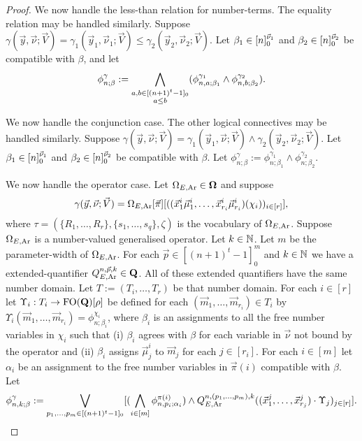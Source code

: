 \documentclass[../main/thesis.tex]{subfiles}
\begin{document}
\begin{proof}
  We now handle the less-than relation for number-terms. The equality relation
  may be handled similarly. Suppose $\gamma(\vec{y}, \vec{\nu}; \vec{V}) =
  \gamma_1(\vec{y}_1, \vec{\nu}_1; \vec{V}) \leq \gamma_2 (\vec{y}_2,
  \vec{\nu}_2 ; \vec{V})$. Let $\beta_1 \in [n]^{\vec{\nu}_1}_0$ and
  $\beta_2 \in [n]^{\vec{\nu}_2}_0$ be compatible with $\beta$, and let
  \begin{align*}
    \phi^{\gamma}_{n; \beta} := \underset{\substack{a, b \in [(n + 1)^{t} - 1]_0 \\ a \leq
    b}}{\bigwedge} (\phi^{\gamma_1}_{n, a; \beta_1} \land \phi^{\gamma_2}_{n, b;
    \beta_2}).
  \end{align*}
  
  We now handle the conjunction case. The other logical connectives may be
  handled similarly. Suppose $\gamma(\vec{y}, \vec{\nu}; \vec{V}) =
  \gamma_1(\vec{y}_1, \vec{\nu} ; \vec{V}) \land \gamma_2 (\vec{y}_2,
  \vec{\nu}_2 ; \vec{V})$. Let $\beta_1 \in [n]^{\vec{\nu}_1}_0$ and
  $\beta_2 \in [n]^{\vec{\nu}_2}_0$ be compatible with $\beta$. Let
  $\phi^{\gamma}_{n ; \beta} := \phi^{\gamma_1}_{n ; \beta_1} \land
  \phi^{\gamma_2}_{n ; \beta_2}$.

  We now handle the operator case. Let $\Omega_{E, \text{\upshape Ar}} \in \mathbf{\mathbf{\Omega}}$ and suppose
  \begin{align*}
    \gamma(\vec{y}, \vec{\nu}; \vec{V}) = \Omega_{E, \text{\upshape Ar}} [\vec{\pi}] [((\vec{x}^i_1 \vec{\mu}^i_1, \ldots, \vec{x}^i_{r_i} \vec{\mu}^i_{r_i})(\chi_i))_{i \in [r]}],
  \end{align*}
  where $\tau = (\{R_1, \ldots, R_r\}, \{s_1, \ldots, s_q\}, \zeta)$ is the
  vocabulary of $\Omega_{E, \text{\upshape Ar}}$. Suppose $\Omega_{E, \text{\upshape Ar}}$ is a number-valued
  generalised operator. Let $k \in \mathbb{N}$. Let $m$ be the parameter-width of
  $\Omega_{E, \text{\upshape Ar}}$. For each $\vec{p} \in [(n+1)^t - 1]^m_0$ and $k \in \mathbb{N}$
  we have a extended-quantifier $Q^{n, \vec{p}, k}_{E, \text{\upshape Ar}} \in \mathbf{Q}$. All
  of these extended quantifiers have the same number domain. Let $T := (T_i,
  \ldots, T_r)$ be that number domain. For each $i \in [r]$ let $\Upsilon_i :
  T_i \rightarrow \text{\upshape FO}(\mathbf{Q})[\rho]$ be defined for each $(\vec{m}_1, \ldots,
  \vec{m}_{r_i}) \in T_i$ by $\Upsilon_i (\vec{m}_1, \ldots, \vec{m}_{r_i}) =
  \phi^{\chi_i}_{n; \beta_i}$, where $\beta_i$ is an assignments to all the free
  number variables in $\chi_i$ such that (i) $\beta_i$ agrees with $\beta$ for
  each variable in $\vec{\nu}$ not bound by the operator and (ii) $\beta_i$
  assigns $\vec{\mu}^i_{j}$ to $\vec{m}_j$ for each $j \in [r_i]$. For each $i
  \in [m]$ let $\alpha_i$ be an assignment to the free number variables in
  $\vec{\pi}(i)$ compatible with $\beta$. Let
  \begin{align*}
    \phi^{\gamma}_{n, k; \beta} := \bigvee_{p_1, \ldots, p_m  \in [(n + 1)^{t} - 1]_0}[(\bigwedge_{i \in [m]} \phi^{\pi(i)}_{n, p_i; \alpha_i}) \land Q^{n, (p_1, \ldots, p_m), k}_{E, \text{\upshape Ar}} ((\vec{x}^{j}_1, \ldots, \vec{x}^{j}_{r_j}) \cdot \Upsilon_j)_{j \in [r]}].
  \end{align*}
  

\end{proof}
\end{document}
